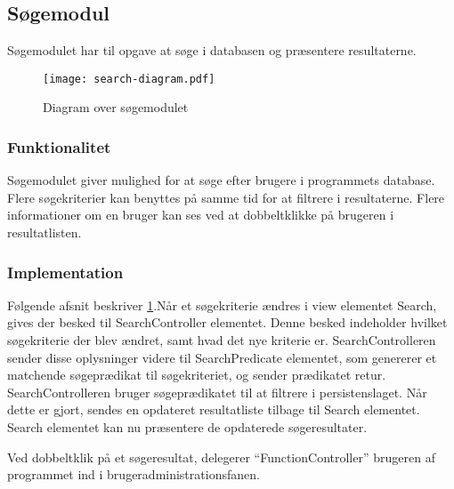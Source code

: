 \subsection{Søgemodul}
\label{sub:s_searchmodul}

Søgemodulet har til opgave at søge i databasen og præsentere resultaterne.

\begin{figure}
  \centering
  \texttt{[image: search-diagram.pdf]}
  \caption{Diagram over søgemodulet} \label{fig:soegemodul}
\end{figure}

\subsubsection{Funktionalitet}

Søgemodulet giver mulighed for at søge efter brugere i programmets database. Flere søgekriterier kan benyttes på samme tid for at filtrere i resultaterne. Flere informationer om en bruger kan ses ved at dobbeltklikke på brugeren i resultatlisten.

\subsubsection{Implementation}

Følgende afsnit beskriver \cref{fig:soegemodul}.Når et søgekriterie ændres i view elementet Search, gives der besked til SearchController elementet. Denne besked indeholder hvilket søgekriterie der blev ændret, samt hvad det nye kriterie er. SearchControlleren sender disse oplysninger videre til SearchPredicate elementet, som genererer et matchende søgeprædikat til søgekriteriet, og sender prædikatet retur. SearchControlleren bruger søgeprædikatet til at filtrere i persistenslaget. Når dette er gjort, sendes en opdateret resultatliste tilbage til Search elementet. Search elementet kan nu præsentere de opdaterede søgeresultater.

Ved dobbeltklik på et søgeresultat, delegerer \enquote{FunctionController} brugeren af programmet ind i brugeradministrationsfanen.



